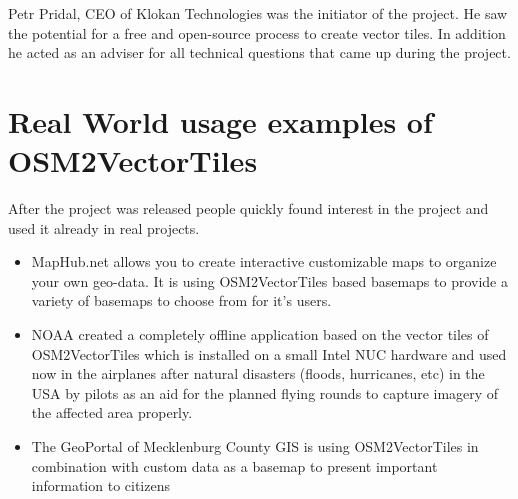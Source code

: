 Petr Pridal, CEO of Klokan Technologies was the initiator of the project. He saw the potential for a free and open-source process to create vector tiles. In addition he acted as an adviser for all technical questions that came up during the project. 

\section{Real World usage examples of OSM2VectorTiles}\label{part1_examples}

After the project was released people quickly found interest in the project and used it already in real projects.

\begin{itemize}
    \item MapHub.net allows you to create interactive customizable maps to organize your own geo-data. It is using OSM2VectorTiles based basemaps to provide a variety of basemaps to choose from for it’s users.
    \item NOAA created a completely offline application based on the vector tiles of OSM2VectorTiles which is installed on a small Intel NUC hardware and used now in the airplanes after natural disasters (floods, hurricanes, etc) in the USA by pilots as an aid for the planned flying rounds to capture imagery of the affected area properly.
    \item The GeoPortal of Mecklenburg County GIS is using OSM2VectorTiles in combination with custom data as a basemap to present important information to citizens
\end{itemize}
